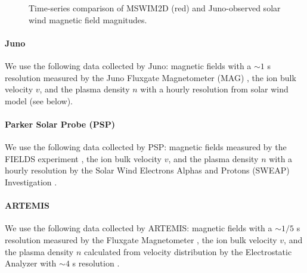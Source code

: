 \documentclass[
  letterpaper,
  DIV=11,
  numbers=noendperiod]{scrartcl}
\let\oldparagraph\paragraph
\renewcommand{\paragraph}[1]{\oldparagraph{#1}\mbox{}}
\begin{document}
\begin{figure}


\caption{\label{fig-model}Time-series comparison of MSWIM2D (red) and
Juno-observed solar wind magnetic field magnitudes.}

\end{figure}%

\paragraph{Juno}\label{juno}

We use the following data collected by Juno: magnetic ﬁelds with a
\(\sim1\) s resolution measured by the Juno Fluxgate Magnetometer (MAG)
\citep{connerney2017}, the ion bulk velocity \(v\), and the plasma
density \(n\) with a hourly resolution from solar wind model (see
below).

\paragraph{Parker Solar Probe (PSP)}\label{parker-solar-probe-psp}

We use the following data collected by PSP: magnetic ﬁelds measured by
the FIELDS experiment \citep{bale2016}, the ion bulk velocity \(v\), and
the plasma density \(n\) with a hourly resolution by the Solar Wind
Electrons Alphas and Protons (SWEAP) Investigation \citep{kasper2016}.

\paragraph{ARTEMIS}\label{artemis}

We use the following data collected by ARTEMIS: magnetic ﬁelds with a
\(\sim 1/5\) s resolution measured by the Fluxgate Magnetometer
\citep{auster2008}, the ion bulk velocity \(v\), and the plasma density
\(n\) calculated from velocity distribution by the Electrostatic
Analyzer with \(\sim 4\) s resolution \citep{mcfadden2009}.
\end{document}

